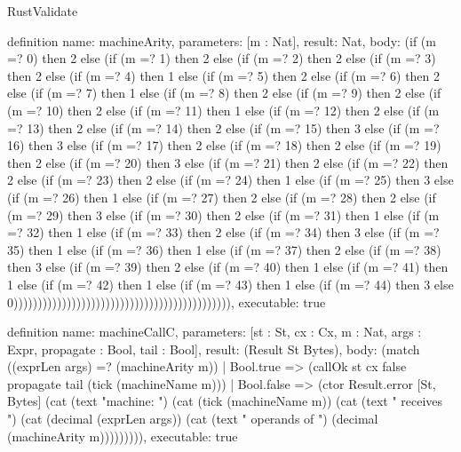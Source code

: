 \begin{lexlean}{RustValidate}
\begin{semanticmodule}
definition{
  name: machineArity,
  parameters: [m : Nat],
  result: Nat,
  body: (if (m =? 0) then 2 else (if (m =? 1) then 2 else (if (m =? 2) then 2 else (if (m =? 3) then 2 else (if (m =? 4) then 1 else (if (m =? 5) then 2 else (if (m =? 6) then 2 else (if (m =? 7) then 1 else (if (m =? 8) then 2 else (if (m =? 9) then 2 else (if (m =? 10) then 2 else (if (m =? 11) then 1 else (if (m =? 12) then 2 else (if (m =? 13) then 2 else (if (m =? 14) then 2 else (if (m =? 15) then 3 else (if (m =? 16) then 3 else (if (m =? 17) then 2 else (if (m =? 18) then 2 else (if (m =? 19) then 2 else (if (m =? 20) then 3 else (if (m =? 21) then 2 else (if (m =? 22) then 2 else (if (m =? 23) then 2 else (if (m =? 24) then 1 else (if (m =? 25) then 3 else (if (m =? 26) then 1 else (if (m =? 27) then 2 else (if (m =? 28) then 2 else (if (m =? 29) then 3 else (if (m =? 30) then 2 else (if (m =? 31) then 1 else (if (m =? 32) then 1 else (if (m =? 33) then 2 else (if (m =? 34) then 3 else (if (m =? 35) then 1 else (if (m =? 36) then 1 else (if (m =? 37) then 2 else (if (m =? 38) then 3 else (if (m =? 39) then 2 else (if (m =? 40) then 1 else (if (m =? 41) then 1 else (if (m =? 42) then 1 else (if (m =? 43) then 1 else (if (m =? 44) then 3 else 0))))))))))))))))))))))))))))))))))))))))))))),
  executable: true
}

definition{
  name: machineCallC,
  parameters: [st : St, cx : Cx, m : Nat, args : Expr, propagate : Bool, tail : Bool],
  result: (Result St Bytes),
  body: (match ((exprLen args) =? (machineArity m))
    | Bool.true => (callOk st cx false propagate tail (tick (machineName m)))
    | Bool.false => (ctor Result.error [St, Bytes] (cat (text "machine: ") (cat (tick (machineName m)) (cat (text " receives ") (cat (decimal (exprLen args)) (cat (text " operands of ") (decimal (machineArity m))))))))),
  executable: true
}


\end{semanticmodule}
\end{lexlean}
